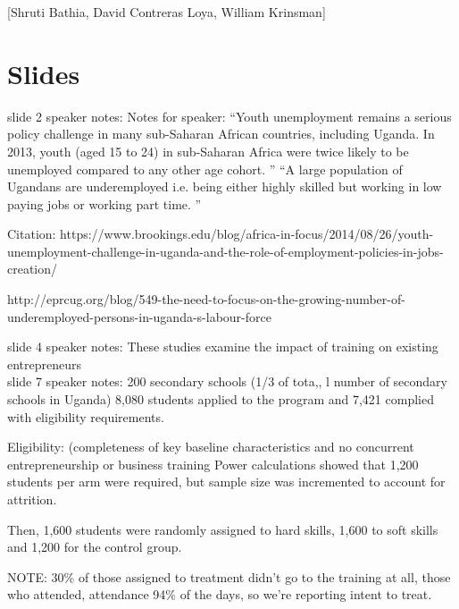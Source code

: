 \documentclass[oneside, notitlepage]{book}
\begin{document}
[Shruti Bathia, David Contreras Loya, William Krinsman]

\section{Slides}
\label{part:slides}

slide 2 speaker notes: Notes for speaker:
“Youth unemployment remains a serious policy challenge in many sub-Saharan African countries, including Uganda. In 2013, youth (aged 15 to 24) in sub-Saharan Africa were twice likely to be unemployed compared to any other age cohort. ”
“A large population of Ugandans are underemployed i.e. being either highly skilled but working in low paying jobs or working part time. ”

Citation: https://www.brookings.edu/blog/africa-in-focus/2014/08/26/youth-unemployment-challenge-in-uganda-and-the-role-of-employment-policies-in-jobs-creation/

http://eprcug.org/blog/549-the-need-to-focus-on-the-growing-number-of-underemployed-persons-in-uganda-s-labour-force






slide 4 speaker notes: These studies examine the impact of training on existing entrepreneurs
\\

slide 7 speaker notes: 200 secondary schools (1/3 of tota,, l number of secondary schools in Uganda)
8,080 students applied to the program and 7,421 complied with eligibility requirements.

Eligibility: (completeness of key baseline characteristics and no concurrent entrepreneurship or business training
Power calculations showed that 1,200 students per arm were required, but sample size was incremented to account for attrition. 

Then, 1,600 students were randomly assigned to hard skills, 1,600 to soft skills and 1,200 for the control group. 

NOTE: 30\% of those assigned to treatment didn’t go to the training at all, those who attended, attendance 94\% of the days, so we’re reporting intent to treat.
\end{document}
